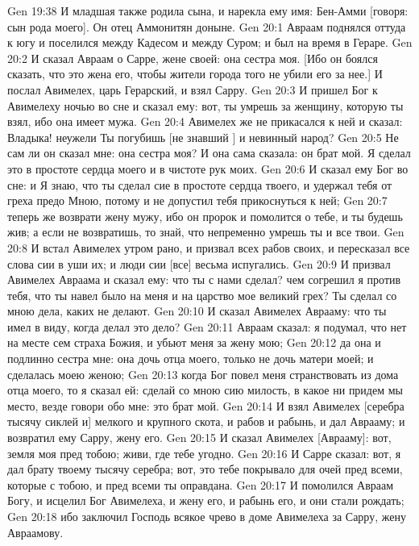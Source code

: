 \vs Gen 19:38 И младшая также родила сына, и нарекла ему имя: Бен-Амми [говоря:  сын рода моего]. Он отец Аммонитян доныне.
\vs Gen 20:1 Авраам поднялся оттуда к югу и поселился между Кадесом и между Суром; и был на время в Гераре.
\vs Gen 20:2 И сказал Авраам о Сарре, жене своей: она сестра моя. [Ибо он боялся сказать, что это жена его, чтобы жители города того не убили его за нее.] И послал Авимелех, царь Герарский, и взял Сарру.
\vs Gen 20:3 И пришел Бог к Авимелеху ночью во сне и сказал ему: вот, ты умрешь за женщину, которую ты взял, ибо она имеет мужа.
\vs Gen 20:4 Авимелех же не прикасался к ней и сказал: Владыка! неужели Ты погубишь [не знавший ] и невинный народ?
\vs Gen 20:5 Не сам ли он сказал мне: она сестра моя? И она сама сказала: он брат мой. Я сделал это в простоте сердца моего и в чистоте рук моих.
\vs Gen 20:6 И сказал ему Бог во сне: и Я знаю, что ты сделал сие в простоте сердца твоего, и удержал тебя от греха предо Мною, потому и не допустил тебя прикоснуться к ней;
\vs Gen 20:7 теперь же возврати жену мужу, ибо он пророк и помолится о тебе, и ты будешь жив; а если не возвратишь, то знай, что непременно умрешь ты и все твои.
\vs Gen 20:8 И встал Авимелех утром рано, и призвал всех рабов своих, и пересказал все слова сии в уши их; и люди сии [все] весьма испугались.
\vs Gen 20:9 И призвал Авимелех Авраама и сказал ему: что ты с нами сделал? чем согрешил я против тебя, что ты навел было на меня и на царство мое великий грех? Ты сделал со мною дела, каких не делают.
\vs Gen 20:10 И сказал Авимелех Аврааму: что ты имел в виду, когда делал это дело?
\vs Gen 20:11 Авраам сказал: я подумал, что нет на месте сем страха Божия, и убьют меня за жену мою;
\vs Gen 20:12 да она и подлинно сестра мне: она дочь отца моего, только не дочь матери моей; и сделалась моею женою;
\vs Gen 20:13 когда Бог повел меня странствовать из дома отца моего, то я сказал ей: сделай со мною сию милость, в какое ни придем мы место, везде говори обо мне: это брат мой.
\vs Gen 20:14 И взял Авимелех [серебра тысячу сиклей и] мелкого и крупного скота, и рабов и рабынь, и дал Аврааму; и возвратил ему Сарру, жену его.
\vs Gen 20:15 И сказал Авимелех [Аврааму]: вот, земля моя пред тобою; живи, где тебе угодно.
\vs Gen 20:16 И Сарре сказал: вот, я дал брату твоему тысячу  серебра; вот, это тебе покрывало для очей пред всеми, которые с тобою, и пред всеми ты оправдана.
\vs Gen 20:17 И помолился Авраам Богу, и исцелил Бог Авимелеха, и жену его, и рабынь его, и они стали рождать;
\vs Gen 20:18 ибо заключил Господь всякое чрево в доме Авимелеха за Сарру, жену Авраамову.
